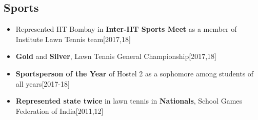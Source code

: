 \documentclass{article}
\begin{document}
\subsection*{\large Sports}
\vspace{-6pt}
\begin{itemize}[itemsep = -2pt, leftmargin=*]
	\item Represented IIT Bombay in \textbf{Inter-IIT Sports Meet} as a member of Institute Lawn Tennis team\hfill{[2017,18]}
	\item \textbf{Gold} and \textbf{Silver}, Lawn Tennis General Championship\hfill{[2017,18]}
	\item \textbf{Sportsperson of the Year} of Hostel 2 as a sophomore among students of all years\hfill{[2017-18]}
	\item \textbf{Represented state twice} in lawn tennis in \textbf{Nationals}, School Games Federation of India\hfill{[2011,12]}
\end{itemize}
\vspace{-20pt}
\end{document}
